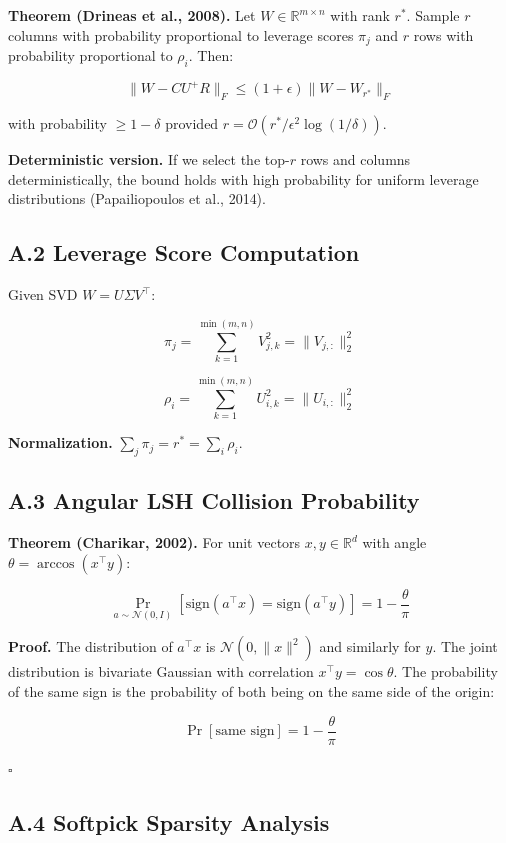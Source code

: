 \textbf{Theorem (Drineas et al., 2008).} Let $W \in \mathbb{R}^{m \times n}$ with 
rank $r^*$. Sample $r$ columns with probability proportional to leverage 
scores $\pi_j$ and $r$ rows with probability proportional to $\rho_i$. Then:

\[
\|W - C U^+ R\|_F \leq (1 + \epsilon) \|W - W_{r^*}\|_F
\tag{A.1}
\]

with probability $\geq 1 - \delta$ provided $r = \mathcal{O}(r^* / \epsilon^2 \log(1/\delta))$.

\textbf{Deterministic version.} If we select the top-$r$ rows and columns 
deterministically, the bound holds with high probability for uniform 
leverage distributions (Papailiopoulos et al., 2014).

\subsection{A.2 Leverage Score Computation}

Given SVD $W = U \Sigma V^\top$:

\[
\pi_j = \sum_{k=1}^{\min(m, n)} V_{j, k}^2 = \|V_{j, :}\|_2^2
\tag{A.2}
\]

\[
\rho_i = \sum_{k=1}^{\min(m, n)} U_{i, k}^2 = \|U_{i, :}\|_2^2
\tag{A.3}
\]

\textbf{Normalization.} $\sum_j \pi_j = r^* = \sum_i \rho_i$.

\subsection{A.3 Angular LSH Collision Probability}

\textbf{Theorem (Charikar, 2002).} For unit vectors $x, y \in \mathbb{R}^d$ with 
angle $\theta = \arccos(x^\top y)$:

\[
\Pr_{a \sim \mathcal{N}(0, I)}[\text{sign}(a^\top x) = \text{sign}(a^\top y)] = 1 - \frac{\theta}{\pi}
\tag{A.4}
\]

\textbf{Proof.} The distribution of $a^\top x$ is $\mathcal{N}(0, \|x\|^2)$ and 
similarly for $y$. The joint distribution is bivariate Gaussian with 
correlation $x^\top y = \cos \theta$. The probability of the same sign is 
the probability of both being on the same side of the origin:

\[
\Pr[\text{same sign}] = 1 - \frac{\theta}{\pi}
\]

$\square$

\subsection{A.4 Softpick Sparsity Analysis}

